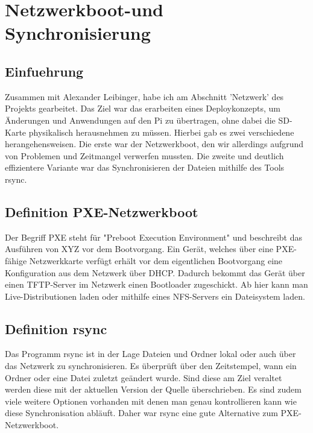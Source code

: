 \documentclass{article}
\begin{document}
\normalsize
\section{Netzwerkboot-und Synchronisierung}
\subsection{Einfuehrung}
Zusammen mit Alexander Leibinger, habe ich am Abschnitt 'Netzwerk' des Projekts gearbeitet. Das Ziel war das erarbeiten eines Deploykonzepts, um Änderungen und Anwendungen auf den Pi zu übertragen, ohne dabei die SD-Karte physikalisch herausnehmen zu müssen.
Hierbei gab es zwei verschiedene herangehensweisen. Die erste war der Netzwerkboot, den wir allerdings aufgrund von Problemen und Zeitmangel verwerfen mussten. Die zweite und deutlich effizientere Variante war das Synchronisieren der Dateien mithilfe des Tools rsync.
\subsection{Definition PXE-Netzwerkboot}
Der Begriff PXE steht für "Preboot Execution Environment" und beschreibt das Ausführen von XYZ vor dem Bootvorgang. Ein Gerät, welches über eine PXE-fähige Netzwerkkarte verfügt erhält vor dem eigentlichen Bootvorgang eine Konfiguration aus dem Netzwerk über DHCP. 
Dadurch bekommt das Gerät über einen TFTP-Server im Netzwerk einen Bootloader zugeschickt.  Ab hier kann man Live-Distributionen laden oder mithilfe eines NFS-Servers ein Dateisystem laden.
\subsection{Definition rsync}
Das Programm rsync ist in der Lage Dateien und Ordner lokal oder auch über das Netzwerk zu synchronisieren. Es überprüft über den Zeitstempel, wann ein Ordner oder eine Datei zuletzt geändert wurde. Sind diese am Ziel veraltet werden diese mit der aktuellen Version der Quelle überschrieben.
Es sind zudem viele weitere Optionen vorhanden mit denen man genau kontrollieren kann wie diese Synchronisation abläuft. Daher war rsync eine gute Alternative zum PXE-Netzwerkboot.
\newpage
\end{document}
